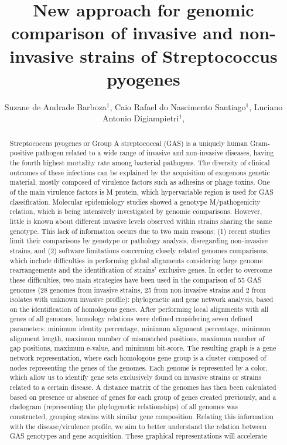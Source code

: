 \documentclass[twoside]{article}
\title{\vspace{-15mm}\fontsize{24pt}{10pt}\selectfont\textbf{ New approach for genomic comparison of invasive and non-invasive strains of Streptococcus pyogenes }} %
\author{ Suzane de Andrade Barboza$^{1}$, Caio Rafael do Nascimento Santiago$^{1}$, Luciano Antonio Digiampietri$^{1}$, }
\affil{ 1 Universidade de São Paulo

 }
\date{}
\begin{document}
  
  
  \maketitle %
  
  
  \thispagestyle{fancy} %
  
  
  \begin{abstract}
  Streptococcus pyogenes or Group A streptococcal (GAS) is a uniquely human Gram-positive pathogen related to a wide range of invasive and non-invasive diseases, having the fourth highest mortality rate among bacterial pathogens. The diversity of clinical outcomes of these infections can be explained by the acquisition of exogenous genetic material, mostly composed of virulence factors such as adhesins or phage toxins. One of the main virulence factors is M protein, which hypervariable region is used for GAS classification. Molecular epidemiology studies showed a genotype M/pathogenicity relation, which is being intensively investigated by genomic comparisons. However, little is known about different invasive levels observed within strains sharing the same genotype. This lack of information occurs due to two main reasons: (1) recent studies limit their comparisons by genotype or pathology analysis, disregarding non-invasive strains, and (2) software limitations concerning closely related genomes comparisons, which include difficulties in performing global alignments considering large genome rearrangements and the identification of strains’ exclusive genes. In order to overcome these difficulties, two main strategies have been used in the comparison of 55 GAS genomes (28 genomes from invasive strains, 25 from non-invasive strains and 2 from isolates with unknown invasive profile): phylogenetic and gene network analysis, based on the identification of homologous genes. After performing local alignments with all genes of all genomes, homology relations were defined considering seven defined parameters: minimum identity percentage, minimum alignment percentage, minimum alignment length, maximum number of mismatched positions, maximum number of gap positions, maximum e-value, and minimum bit-score. The resulting graph is a gene network representation, where each homologous gene group is a cluster composed of nodes representing the genes of the genomes. Each genome is represented by a color, which allow us to identify gene sets exclusively found on invasive strains or strains related to a certain disease. A distance matrix of the genomes has then been calculated based on presence or absence of genes for each group of genes created previously, and a cladogram (representing the phylogenetic relationships) of all genomes was constructed, grouping strains with similar gene composition. Relating this information with the disease/virulence profile, we aim to better understand the relation between GAS genotypes and gene acquisition. These graphical representations will accelerate 
\end{abstract}
\end{document}
